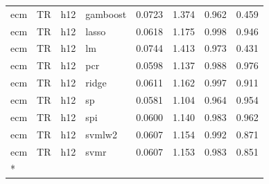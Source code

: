 \begin{ThreePartTable}
\begin{longtable}[t]{llclcccc}
ecm & TR & h12 & gamboost & 0.0723 & 1.374 & 0.962 & 0.459\\
ecm & TR & h12 & lasso & 0.0618 & 1.175 & 0.998 & 0.946\\
ecm & TR & h12 & lm & 0.0744 & 1.413 & 0.973 & 0.431\\
ecm & TR & h12 & pcr & 0.0598 & 1.137 & 0.988 & 0.976\\
ecm & TR & h12 & ridge & 0.0611 & 1.162 & 0.997 & 0.911\\
ecm & TR & h12 & sp & 0.0581 & 1.104 & 0.964 & 0.954\\
ecm & TR & h12 & spi & 0.0600 & 1.140 & 0.983 & 0.962\\
ecm & TR & h12 & svmlw2 & 0.0607 & 1.154 & 0.992 & 0.871\\
ecm & TR & h12 & svmr & 0.0607 & 1.153 & 0.983 & 0.851\\*
\end{longtable}
\end{ThreePartTable}
\endgroup{}
